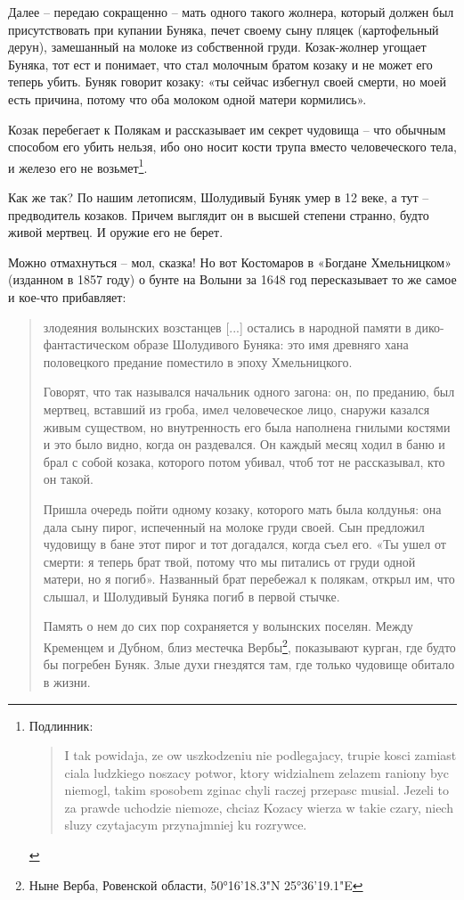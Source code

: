 Далее – передаю сокращенно – мать одного такого жолнера, который должен был присутствовать при купании Буняка, печет своему сыну пляцек (картофельный дерун), замешанный на молоке из собственной груди. Козак-жолнер угощает Буняка, тот ест и понимает, что стал молочным братом козаку и не может его теперь убить. Буняк говорит козаку: «ты сейчас избегнул своей смерти, но моей есть причина, потому что оба молоком одной матери кормились».

Козак перебегает к Полякам и рассказывает им секрет чудовища – что обычным способом его убить нельзя, ибо оно носит кости трупа вместо человеческого тела, и железо его не возьмет\footnote{Подлинник:\begin{otherlanguage}{polish}
\begin{quotation}
I tak powidaja, ze ow uszkodzeniu nie podlegajacy, trupie kosci zamiast ciala ludzkiego noszacy potwor, ktory widzialnem zelazem raniony byc niemogl, takim sposobem zginac chyli raczej przepasc musial. Jezeli to za prawde uchodzie niemoze, chciaz Kozacy wierza w takie czary, niech sluzy czytajacym przynajmniej ku rozrywce.\end{quotation}\end{otherlanguage}}.

Как же так? По нашим летописям, Шолудивый Буняк умер в 12 веке, а тут – предводитель козаков. Причем выглядит он в высшей степени странно, будто живой мертвец. И оружие его не берет.

Можно отмахнуться – мол, сказка! Но вот Костомаров в «Богдане Хмельницком» (изданном в 1857 году) о бунте на Волыни за 1648 год пересказывает то же самое и кое-что прибавляет:

\begin{quotation}
злодеяния волынских возстанцев [...] остались в народной памяти в дико-фантастическом образе Шолудивого Буняка: это имя древняго хана половецкого предание поместило в эпоху Хмельницкого.

Говорят, что так назывался начальник одного загона: он, по преданию, был мертвец, вставший из гроба, имел человеческое лицо, снаружи казался живым существом, но внутренность его была наполнена гнилыми костями и это было видно, когда он раздевался. Он каждый месяц ходил в баню и брал с собой козака, которого потом убивал, чтоб тот не рассказывал, кто он такой.

Пришла очередь пойти одному козаку, которого мать была колдунья: она дала сыну пирог, испеченный на молоке груди своей. Сын предложил чудовищу в бане этот пирог и тот догадался, когда съел его. «Ты ушел от смерти: я теперь брат твой, потому что мы питались от груди одной матери, но я погиб». Названный брат перебежал к полякам, открыл им, что слышал, и Шолудивый Буняка погиб в первой стычке.

Память о нем до сих пор сохраняется у волынских поселян. Между Кременцем и Дубном, близ местечка Вербы\footnote{Ныне Верба, Ровенской области, 50°16'18.3"N 25°36'19.1"E}, показывают курган, где будто бы погребен Буняк. Злые духи гнездятся там, где только чудовище обитало в жизни.
\end{quotation}

